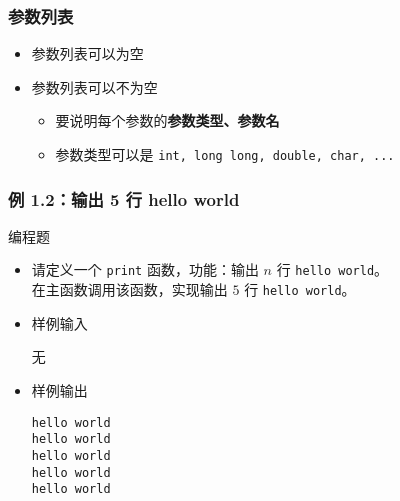 \begin{frame}[fragile]
    \frametitle{参数列表}

    \begin{itemize}
        \item 参数列表可以为空
        \item 参数列表可以不为空
        \begin{itemize}
            \item 要说明每个参数的\textbf{参数类型、参数名}
            \item 参数类型可以是 \lstinline|int, long long, double, char, ...| 
        \end{itemize}
    \end{itemize}
\end{frame}

\begin{frame}[fragile]
    \frametitle{例 1.2：输出 5 行 hello world}
        \begin{exampleblock}{编程题}

            \begin{itemize}
                \item 请定义一个 \lstinline|print| 函数，功能：输出 $n$ 行 \lstinline|hello world|。\\
                    在主函数调用该函数，实现输出 $5$ 行 \lstinline|hello world|。

                \item 样例输入

                    无

                \item 样例输出

                    \lstinline|hello world|\\
                    \lstinline|hello world|\\
                    \lstinline|hello world|\\
                    \lstinline|hello world|\\
                    \lstinline|hello world|

            \end{itemize}

        \end{exampleblock}
\end{frame}

